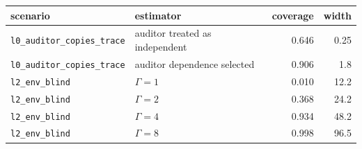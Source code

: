 \begin{tabular}{llrr}
\toprule
scenario & estimator & coverage & width \\
\midrule
\texttt{l0\_auditor\_copies\_trace} & auditor treated as independent & 0.646 & 0.25 \\
\texttt{l0\_auditor\_copies\_trace} & auditor dependence selected & 0.906 & 1.8 \\
\texttt{l2\_env\_blind} & $\Gamma = 1$ & 0.010 & 12.2 \\
\texttt{l2\_env\_blind} & $\Gamma = 2$ & 0.368 & 24.2 \\
\texttt{l2\_env\_blind} & $\Gamma = 4$ & 0.934 & 48.2 \\
\texttt{l2\_env\_blind} & $\Gamma = 8$ & 0.998 & 96.5 \\
\bottomrule
\end{tabular}
\par{}
